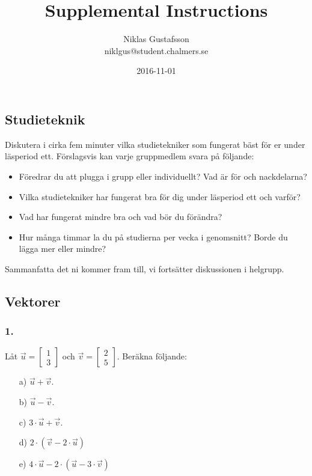 \documentclass{article}
\title{Supplemental Instructions}
\author{Niklas Gustafsson \\ 
		\small{niklgus@student.chalmers.se}
}
\date{
      2016-11-01
     }
\begin{document}
\maketitle

\subsection*{Studieteknik}
Diskutera i cirka fem minuter vilka studietekniker som fungerat bäst för er under läsperiod ett. Förslagsvis kan varje gruppmedlem svara på följande:
\begin{itemize}
\item Föredrar du att plugga i grupp eller individuellt? Vad är för och nackdelarna?
\item Vilka studietekniker har fungerat bra för dig under läsperiod ett och varför?
\item Vad har fungerat mindre bra och vad bör du förändra?
\item Hur många timmar la du på studierna per vecka i genomsnitt? Borde du lägga mer eller mindre?
\end{itemize}

\noindent
Sammanfatta det ni kommer fram till, vi fortsätter diskussionen i helgrupp. 

\subsection*{Vektorer}

\subsubsection*{1.}
Låt $\vec{u} = \begin{bmatrix} 1 \\ 3 \end{bmatrix}$ och $\vec{v} = \begin{bmatrix} 2 \\ 5 \end{bmatrix}$. Beräkna följande:
\begin{itemize}
\item[a) ] $\vec{u} + \vec{v}$.
\item[b) ] $\vec{u} - \vec{v}$.
\item[c) ] $3 \cdot \vec{u} + \vec{v}$.
\item[d) ] $2 \cdot(\vec{v} - 2 \cdot \vec{u})$
\item[e) ] $4 \cdot \vec{u} -2 \cdot (\vec{u} -3 \cdot \vec{v})$
\end{itemize} 
\end{document}
